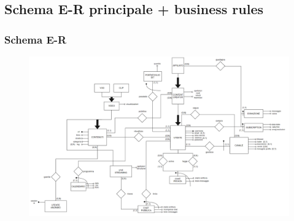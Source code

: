 \newpage
{}
\begin{landscape}
\subsection{Schema E-R principale + business rules}
\vspace{-\parskip} %
\subsubsection{Schema E-R}
\vspace{-\parskip} %
\begin{figure}[h]
    \centering
    \includegraphics[scale=0.5]{img/ER1.png}
\end{figure}
\end{landscape}
\restoregeometry


